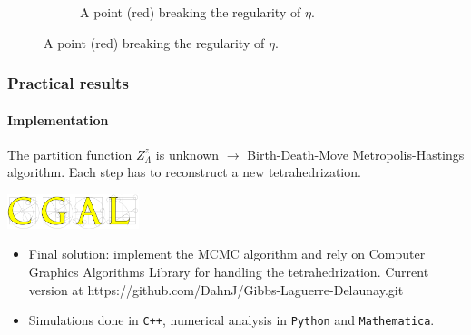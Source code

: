 \documentclass[c, 10pt]{beamer}
\begin{document}
\begin{frame}
\begin{figure}
\begin{minipage}{0.45\textwidth}
\begin{figure}[p]
{
}
\caption{\scriptsize A point (red) breaking the regularity of $\eta$.}
\label{fig:Laguerrecospherical}
\end{figure}
    \end{minipage}
\end{figure}

\vspace{-4mm}

\end{frame}





\begin{frame}\frametitle{Practical results}
	\framesubtitle{Implementation}

	The partition function $Z^z_\Lambda$ is unknown $\rightarrow$ Birth-Death-Move Metropolis-Hastings algorithm. \newline
	Each step has to reconstruct a new tetrahedrization.
	
\begin{center}
\includegraphics[height = 1cm]{./FigureLayout/cgal.png}
\end{center}


\begin{itemize}
	\item Final solution: implement the MCMC algorithm and rely on Computer Graphics Algorithms Library for handling the tetrahedrization. \newline
		{\footnotesize Current version at \alert{https://github.com/DahnJ/Gibbs-Laguerre-Delaunay.git}}
	\item Simulations done in \texttt{C++}, numerical analysis in \texttt{Python} and \texttt{Mathematica}.
\end{itemize}

\end{frame}
\end{document}

